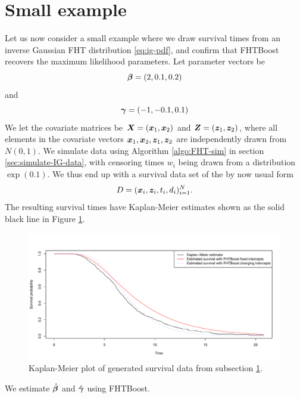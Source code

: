 \section{Small example}
\label{subsec:algo-example}
Let us now consider a small example where we draw survival times from an inverse Gaussian FHT distribution \eqref{eq:ig-pdf}, and confirm that FHTBoost recovers the maximum likelihood parameters.
Let parameter vectors be
\begin{equation*}
    \boldsymbol{\beta}=(2,0.1,0.2)
\end{equation*}
and
\begin{equation*}
    \boldsymbol{\gamma}=(-1, -0.1, 0.1)
\end{equation*}
We let the covariate matrices be $\bm{X}=(\bm{x}_1,\bm{x}_2)$ and $\bm{Z}=(\bm{z}_1,\bm{z}_2)$, where all elements in the covariate vectors $\bm{x}_1,\bm{x}_2,\bm{z}_1,\bm{z}_2$ are independently drawn from $N(0,1)$.
We simulate data using Algorithm \ref{algo:FHT-sim} in section \ref{sec:simulate-IG-data}, with censoring times $w_i$ being drawn from a distribution $\exp(0.1)$.
We thus end up with a survival data set of the by now usual form
\begin{equation*}
    D=(\bm{x}_i,\bm{z}_i,t_i,d_i)_{i=1}^N.
\end{equation*}
The resulting survival times have Kaplan-Meier estimates shown as the solid black line in Figure \ref{fig:small-example-kaplan-meier}.
\begin{figure}
\caption{Kaplan-Meier plot of generated survival data from subsection \ref{subsec:algo-example}.}
\label{fig:small-example-kaplan-meier}
\centering\includegraphics[scale=0.4]{figures/kaplan_meier_small.pdf}
\end{figure}
We estimate $\hat{\boldsymbol{\beta}}$ and $\hat{\boldsymbol{\gamma}}$ using FHTBoost.
